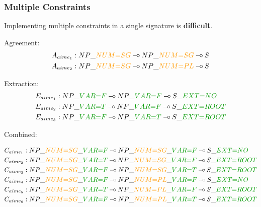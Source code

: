 \documentclass{beamer}
\def\limp {\mathbin{{-}\mkern-3.5mu{\circ}}}
\begin{document}
\begin{frame}
  \frametitle{Multiple Constraints}

  Implementing multiple constraints in a single signature is
  \textbf{difficult}.

  Agreement:
    \begin{align*}
      A_{aime_1} &: NP\_\textcolor{darkgold}{NUM{=}SG} \limp NP\_\textcolor{darkgold}{NUM{=}SG} \limp S \\
      A_{aime_2} &: NP\_\textcolor{darkgold}{NUM{=}SG} \limp NP\_\textcolor{darkgold}{NUM{=}PL} \limp S
    \end{align*}

  Extraction:
    \begin{align*}
      E_{aime_1} &: NP\_\textcolor{darkgreen}{VAR{=}F} \limp NP\_\textcolor{darkgreen}{VAR{=}F} \limp S\_\textcolor{darkgreen}{EXT{=}NO} \\
      E_{aime_2} &: NP\_\textcolor{darkgreen}{VAR{=}T} \limp NP\_\textcolor{darkgreen}{VAR{=}F} \limp S\_\textcolor{darkgreen}{EXT{=}ROOT} \\
      E_{aime_3} &: NP\_\textcolor{darkgreen}{VAR{=}F} \limp NP\_\textcolor{darkgreen}{VAR{=}T} \limp S\_\textcolor{darkgreen}{EXT{=}ROOT}
    \end{align*}

  Combined:
  \begin{small}
  \begin{align*}
      C_{aime_1} &: NP\_\textcolor{darkgold}{NUM{=}SG}\_\textcolor{darkgreen}{VAR{=}F} \limp NP\_\textcolor{darkgold}{NUM{=}SG}\_\textcolor{darkgreen}{VAR{=}F} \limp S\_\textcolor{darkgreen}{EXT{=}NO} \\
      C_{aime_2} &: NP\_\textcolor{darkgold}{NUM{=}SG}\_\textcolor{darkgreen}{VAR{=}T} \limp NP\_\textcolor{darkgold}{NUM{=}SG}\_\textcolor{darkgreen}{VAR{=}F} \limp S\_\textcolor{darkgreen}{EXT{=}ROOT} \\
      C_{aime_3} &: NP\_\textcolor{darkgold}{NUM{=}SG}\_\textcolor{darkgreen}{VAR{=}F} \limp NP\_\textcolor{darkgold}{NUM{=}SG}\_\textcolor{darkgreen}{VAR{=}T} \limp S\_\textcolor{darkgreen}{EXT{=}ROOT} \\
      C_{aime_4} &: NP\_\textcolor{darkgold}{NUM{=}SG}\_\textcolor{darkgreen}{VAR{=}F} \limp NP\_\textcolor{darkgold}{NUM{=}PL}\_\textcolor{darkgreen}{VAR{=}F} \limp S\_\textcolor{darkgreen}{EXT{=}NO} \\
      C_{aime_5} &: NP\_\textcolor{darkgold}{NUM{=}SG}\_\textcolor{darkgreen}{VAR{=}T} \limp NP\_\textcolor{darkgold}{NUM{=}PL}\_\textcolor{darkgreen}{VAR{=}F} \limp S\_\textcolor{darkgreen}{EXT{=}ROOT} \\
      C_{aime_6} &: NP\_\textcolor{darkgold}{NUM{=}SG}\_\textcolor{darkgreen}{VAR{=}F} \limp NP\_\textcolor{darkgold}{NUM{=}PL}\_\textcolor{darkgreen}{VAR{=}T} \limp S\_\textcolor{darkgreen}{EXT{=}ROOT}
  \end{align*}

  \end{small}
\end{frame}
\end{document}
